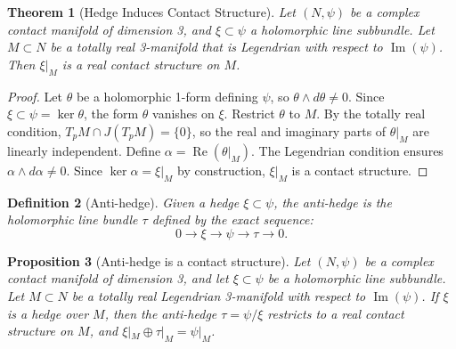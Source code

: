 \documentclass{amsart}
\newtheorem{theorem}{Theorem}
\newtheorem{definition}[theorem]{Definition}
\newtheorem{proposition}[theorem]{Proposition}
\begin{document}
\begin{theorem}[Hedge Induces Contact Structure]
Let $(N, \psi)$ be a complex contact manifold of dimension 3, and $\xi \subset \psi$ a holomorphic line subbundle. Let $M \subset N$ be a totally real 3-manifold that is Legendrian with respect to $\operatorname{Im}(\psi)$. Then $\xi|_M$ is a real contact structure on $M$.
\end{theorem}

\begin{proof}
Let $\theta$ be a holomorphic 1-form defining $\psi$, so $\theta \wedge d\theta \neq 0$. Since $\xi \subset \psi = \ker\theta$, the form $\theta$ vanishes on $\xi$. Restrict $\theta$ to $M$. By the totally real condition, $T_pM \cap J(T_pM) = \{0\}$, so the real and imaginary parts of $\theta|_M$ are linearly independent. Define $\alpha = \operatorname{Re}(\theta|_M)$. The Legendrian condition ensures $\alpha \wedge d\alpha \neq 0$. Since $\ker\alpha = \xi|_M$ by construction, $\xi|_M$ is a contact structure.
\end{proof}

\begin{definition}[Anti-hedge]
Given a hedge $\xi \subset \psi$, the \emph{anti-hedge} is the holomorphic line bundle $\tau$ defined by the exact sequence:
\[
0 \to \xi \to \psi \to \tau \to 0.
\]
\end{definition}
\begin{proposition}[Anti-hedge is a contact structure]
\label{prop:anti_hedge}
Let $(N, \psi)$ be a complex contact manifold of dimension 3, and let $\xi \subset \psi$ be a holomorphic line subbundle. Let $M \subset N$ be a totally real Legendrian 3-manifold with respect to $\operatorname{Im}(\psi)$. If $\xi$ is a hedge over $M$, then the anti-hedge $\tau = \psi / \xi$ restricts to a real contact structure on $M$, and $\xi|_M \oplus \tau|_M = \psi|_M$.
\end{proposition}
\end{document}

